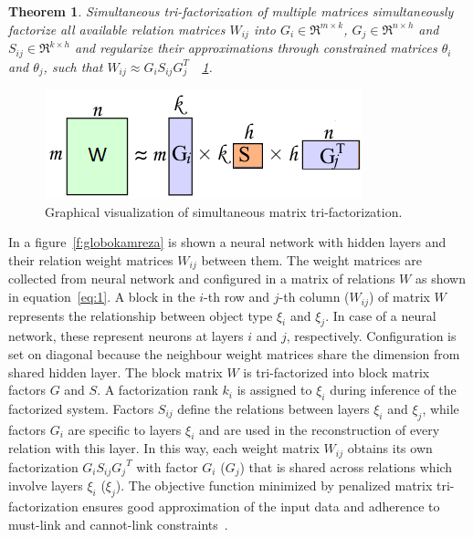 \documentclass{article} %
\newtheorem{theorem}{Theorem}[section]
\begin{document}
\begin{theorem}\label{t:2}
Simultaneous tri-factorization of multiple matrices simultaneously 
factorize all available relation matrices $W_{ij}$ into $G_i \in \Re^{m \times 
k}$, $G_j \in \Re^{n \times h}$ and $S_{ij} \in \Re^{k \times h}$ and regularize 
their approximations through constrained matrices $\theta_i$ and $\theta_j$, 
such that $W_{ij} \approx G_iS_{ij}G_j^T$~\cite{zitnik2015data}~\ref{f:mf2}.
\end{theorem} 

\begin{figure}[!ht]
\centering 
\includegraphics[width=.5\textwidth]{mf2.png}
\caption{Graphical visualization of simultaneous matrix tri-factorization.}
\label{f:mf2}
\end{figure}

In a figure~\ref{f:globokamreza} is shown a neural network with hidden
layers and their relation weight matrices $W_{ij}$ between them. The weight
matrices are collected from neural network and configured in a matrix of
relations $W$ as shown in equation~\ref{eq:1}. A block in the $i$-th
row and $j$-th column ($W_{ij}$) of matrix $W$ represents the relationship
between object type $\xi_i$ and $\xi_j$. In case of a neural network, these
represent neurons at layers $i$ and $j$, respectively. Configuration is set on
diagonal because the neighbour weight matrices share the dimension from shared
hidden layer. The block matrix $W$ is
tri-factorized into block matrix factors $G$ and $S$. A factorization rank
$k_i$ is assigned to $\xi_i$ during inference of the factorized system. Factors
$S_{ij}$ define the relations between layers $\xi_i$ and $\xi_j$, while
factors $G_i$ are specific to layers $\xi_i$ and are used in the
reconstruction of every relation with this layer. In this way, each
weight matrix $W_{ij}$ obtains its own factorization $G_i S_{ij} {G_j}^T$ with
factor $G_i$ ($G_j$) that is shared across relations which involve layers
$\xi_i$ ($\xi_j$). The objective function minimized by penalized matrix
tri-factorization ensures good approximation of the input data and adherence to
must-link and cannot-link constraints~\cite{zitnik2015data}.
\end{document}
